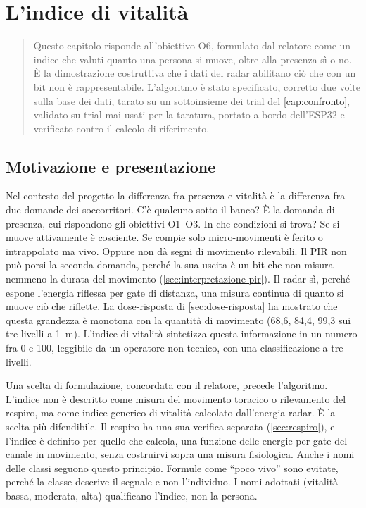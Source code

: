 \chapter{L'indice di vitalità}
\label{cap:vitalita}

\begin{quote}\small
Questo capitolo risponde all'obiettivo O6, formulato dal relatore come un indice che
valuti quanto una persona si muove, oltre alla presenza sì o no. È la dimostrazione
costruttiva che i dati del radar abilitano ciò che con un bit non è rappresentabile.
L'algoritmo è stato specificato, corretto due volte sulla base dei dati, tarato su
un sottoinsieme dei trial del \cref{cap:confronto}, validato su trial mai usati per la
taratura, portato a bordo dell'ESP32 e verificato contro il calcolo di riferimento.
\end{quote}

\section{Motivazione e presentazione}
\label{sec:vitalita-motivazione}
\label{sec:vitalita-presentazione}

Nel contesto del progetto la differenza fra presenza e vitalità è la differenza fra
due domande dei soccorritori. C'è qualcuno sotto il banco? È la domanda di presenza,
cui rispondono gli obiettivi O1--O3. In che condizioni si trova? Se si muove
attivamente è cosciente. Se compie solo micro-movimenti è ferito o intrappolato ma
vivo. Oppure non dà segni di movimento rilevabili. Il PIR non può porsi la seconda
domanda, perché la sua uscita è un bit che non misura nemmeno la durata del movimento
(\cref{sec:interpretazione-pir}). Il radar sì, perché espone l'energia riflessa per
gate di distanza, una misura continua di quanto si muove ciò che riflette. La
dose-risposta di \cref{sec:dose-risposta} ha mostrato che questa grandezza è monotona
con la quantità di movimento (68,6, 84,4, 99,3 sui tre livelli a 1~m). L'indice di
vitalità sintetizza questa informazione in un numero fra 0 e 100, leggibile da un
operatore non tecnico, con una classificazione a tre livelli.

Una scelta di formulazione, concordata con il relatore, precede l'algoritmo. L'indice
non è descritto come misura del movimento toracico o rilevamento del respiro, ma come
indice generico di vitalità calcolato dall'energia radar. È la scelta più difendibile.
Il respiro ha una sua verifica separata (\cref{sec:respiro}), e l'indice è definito
per quello che calcola, una funzione delle energie per gate del canale in movimento,
senza costruirvi sopra una misura fisiologica. Anche i nomi delle classi seguono
questo principio. Formule come ``poco vivo'' sono evitate, perché la classe descrive
il segnale e non l'individuo. I nomi adottati (vitalità bassa, moderata, alta)
qualificano l'indice, non la persona.

